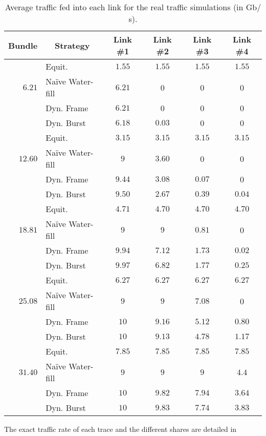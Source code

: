 \documentclass[journal,english,twocolumn,10pt,letterpaper]{IEEEtran}
\begin{document}
\begin{table}
  \centering
\begin{tabular}{rlcccc}
      \multicolumn{1}{c}{Bundle} &
      \multicolumn{1}{c}{Strategy} & 
      \multicolumn{1}{c}{Link \#1} & 
      \multicolumn{1}{c}{Link \#2} & 
      \multicolumn{1}{c}{Link \#3} & 
      \multicolumn{1}{c}{Link \#4} \\\hline
      & Equit. & $1.55$ &$1.55$ &$1.55$ &$1.55$ \\
      $6.21$ & Naïve Water-fill & $6.21$ & 0 & 0 & 0 \\
      & Dyn. Frame & $6.21$ & 0 & 0 & 0\\    
      & Dyn. Burst & $6.18$ & $0.03$ & 0 & 0\\\hline    
      & Equit. & $3.15$ &$3.15$ &$3.15$ &$3.15$ \\
      $12.60$ & Naïve Water-fill & $9$ & $3.60$ & 0 & 0 \\
      & Dyn. Frame & $9.44$ & $3.08$ & $0.07$ & 0 \\
      & Dyn. Burst & $9.50$ & $2.67$ & $0.39$ & $0.04$\\\hline    
      & Equit. & $4.71$ &$4.70$ &$4.70$ &$4.70$ \\
      $18.81$ & Naïve Water-fill & $9$ & $9$ & $0.81$ & 0 \\
      & Dyn. Frame & $9.94$ & $7.12$ & $1.73$ & $0.02$ \\
      & Dyn. Burst & $9.97$ & $6.82$ & $1.77$ & $0.25$\\\hline     
      & Equit. & $6.27$ &$6.27$ &$6.27$ &$6.27$ \\
      $25.08$ & Naïve Water-fill & $9$ & $9$ & $7.08$ & 0 \\
      & Dyn. Frame & $10$ & $9.16$ & $5.12$ & $0.80$ \\
      & Dyn. Burst & $10$ & $9.13$ & $4.78$ & $1.17$\\\hline     
      & Equit. & $7.85$ &$7.85$ &$7.85$ &$7.85$ \\
      $31.40$ & Naïve Water-fill & $9$ & $9$ & $9$ & $4.4$ \\
      & Dyn. Frame & $10$ & $9.82$ & $7.94$ & $3.64$ \\
      & Dyn. Burst & $10$ & $9.83$ & $7.74$ & $3.83$\\\hline     
    \end{tabular}
\caption{Average traffic fed into each link for the real traffic simulations
    (in Gb$/$s).}
  \label{tab:caida}
\end{table}
The exact traffic rate of each trace and the different shares are detailed in
\end{document}
